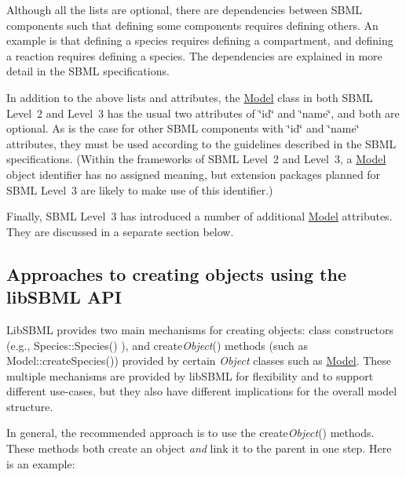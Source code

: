 Although all the lists are optional, there are dependencies between S\+B\+ML components such that defining some components requires defining others. An example is that defining a species requires defining a compartment, and defining a reaction requires defining a species. The dependencies are explained in more detail in the S\+B\+ML specifications.

In addition to the above lists and attributes, the \hyperlink{class_model}{Model} class in both S\+B\+ML Level~2 and Level~3 has the usual two attributes of \char`\"{}id\char`\"{} and \char`\"{}name\char`\"{}, and both are optional. As is the case for other S\+B\+ML components with \char`\"{}id\char`\"{} and \char`\"{}name\char`\"{} attributes, they must be used according to the guidelines described in the S\+B\+ML specifications. (Within the frameworks of S\+B\+ML Level~2 and Level~3, a \hyperlink{class_model}{Model} object identifier has no assigned meaning, but extension packages planned for S\+B\+ML Level~3 are likely to make use of this identifier.)

Finally, S\+B\+ML Level~3 has introduced a number of additional \hyperlink{class_model}{Model} attributes. They are discussed in a separate section below.\hypertarget{class_model_approaches}{}\subsection{Approaches to creating objects using the lib\+S\+B\+M\+L A\+PI}\label{class_model_approaches}
Lib\+S\+B\+ML provides two main mechanisms for creating objects\+: class constructors (e.\+g., Species\+::\+Species() ), and {\ttfamily create{\itshape Object}()} methods (such as Model\+::create\+Species()) provided by certain {\itshape Object} classes such as \hyperlink{class_model}{Model}. These multiple mechanisms are provided by lib\+S\+B\+ML for flexibility and to support different use-\/cases, but they also have different implications for the overall model structure.

In general, the recommended approach is to use the {\ttfamily create{\itshape Object}()} methods. These methods both create an object {\itshape and} link it to the parent in one step. Here is an example\+:

